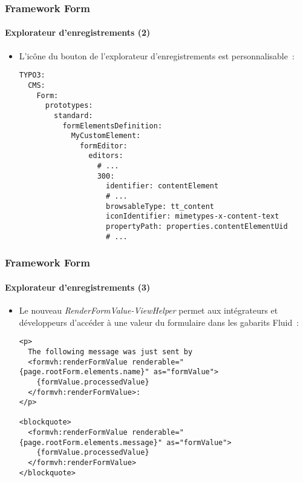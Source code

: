 
\begin{frame}[fragile]
	\frametitle{Framework Form}
	\framesubtitle{Explorateur d'enregistrements (2)}

	\lstset{basicstyle=\tiny\ttfamily}

	\begin{itemize}
		\item L'icône du bouton de l'explorateur d'enregistrements est personnalisable~:
\begin{lstlisting}
TYPO3:
  CMS:
    Form:
      prototypes:
        standard:
          formElementsDefinition:
            MyCustomElement:
              formEditor:
                editors:
                  # ...
                  300:
                    identifier: contentElement
                    # ...
                    browsableType: tt_content
                    iconIdentifier: mimetypes-x-content-text
                    propertyPath: properties.contentElementUid
                    # ...
\end{lstlisting}

	\end{itemize}

\end{frame}


\begin{frame}[fragile]
	\frametitle{Framework Form}
	\framesubtitle{Explorateur d'enregistrements (3)}

	\lstset{basicstyle=\tiny\ttfamily}

	\begin{itemize}
		\item Le nouveau \textit{RenderFormValue-ViewHelper} permet aux intégrateurs et développeurs
			d'accéder à une valeur du formulaire dans les gabarits Fluid~:
\begin{lstlisting}
<p>
  The following message was just sent by
  <formvh:renderFormValue renderable="{page.rootForm.elements.name}" as="formValue">
    {formValue.processedValue}
  </formvh:renderFormValue>:
</p>

<blockquote>
  <formvh:renderFormValue renderable="{page.rootForm.elements.message}" as="formValue">
    {formValue.processedValue}
  </formvh:renderFormValue>
</blockquote>
\end{lstlisting}

	\end{itemize}

\end{frame}


